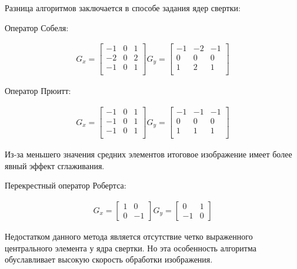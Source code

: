 Разница алгоритмов заключается в способе задания ядер свертки:

Оператор Собеля:

\begin{eqnarray}\label{eq:sobel-matrixs}
G_x = \begin{bmatrix}
-1 & 0 & 1\\
-2 & 0 & 2\\
-1 & 0 & 1\\
\end{bmatrix} 
G_y = \begin{bmatrix}
-1 & -2 & -1\\
0 & 0 & 0\\
1 & 2 & 1\\
\end{bmatrix}
\end{eqnarray}

Оператор Прюитт:

\begin{eqnarray}\label{eq:prewitt-matrixs}
G_x = \begin{bmatrix}
-1 & 0 & 1\\
-1 & 0 & 1\\
-1 & 0 & 1\\
\end{bmatrix} 
G_y = \begin{bmatrix}
-1 & -1 & -1\\
0 & 0 & 0\\
1 & 1 & 1\\
\end{bmatrix}
\end{eqnarray}

Из-за меньшего значения средних элементов итоговое изображение имеет более явный эффект сглаживания.

Перекрестный оператор Робертса:

\begin{eqnarray}\label{eq:roberts-matrixs}
G_x = \begin{bmatrix}
1 & 0\\
0 & -1
\end{bmatrix} 
G_y = \begin{bmatrix}
0 & 1\\
-1 & 0
\end{bmatrix}
\end{eqnarray}

Недостатком данного метода является отсутствие четко выраженного центрального элемента у ядра свертки. Но эта особенность алгоритма обуславливает высокую скорость обработки изображения.

